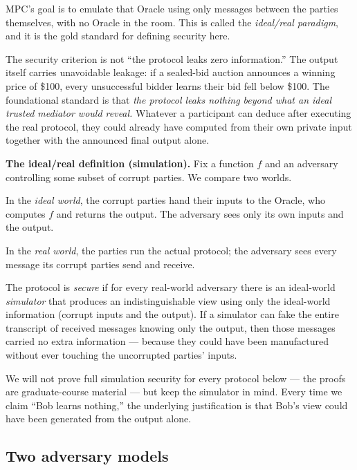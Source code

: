 MPC's goal is to emulate that Oracle using only messages between the parties themselves, with no Oracle in the room. This is called the \emph{ideal/real paradigm}, and it is the gold standard for defining security here.

\begin{intuitionbox}
The security criterion is not ``the protocol leaks zero information.'' The output itself carries unavoidable leakage: if a sealed-bid auction announces a winning price of \$100, every unsuccessful bidder learns their bid fell below \$100. The foundational standard is that \emph{the protocol leaks nothing beyond what an ideal trusted mediator would reveal.} Whatever a participant can deduce after executing the real protocol, they could already have computed from their own private input together with the announced final output alone.
\end{intuitionbox}

\begin{formalbox}
\textbf{The ideal/real definition (simulation).} Fix a function $f$ and an adversary controlling some subset of corrupt parties. We compare two worlds.

In the \emph{ideal world}, the corrupt parties hand their inputs to the Oracle, who computes $f$ and returns the output. The adversary sees only its own inputs and the output.

In the \emph{real world}, the parties run the actual protocol; the adversary sees every message its corrupt parties send and receive.

The protocol is \emph{secure} if for every real-world adversary there is an ideal-world \emph{simulator} that produces an indistinguishable view using only the ideal-world information (corrupt inputs and the output). If a simulator can fake the entire transcript of received messages knowing only the output, then those messages carried no extra information --- because they could have been manufactured without ever touching the uncorrupted parties' inputs.
\end{formalbox}

We will not prove full simulation security for every protocol below --- the proofs are graduate-course material --- but keep the simulator in mind. Every time we claim ``Bob learns nothing,'' the underlying justification is that Bob's view could have been generated from the output alone.

\subsection{Two adversary models}

